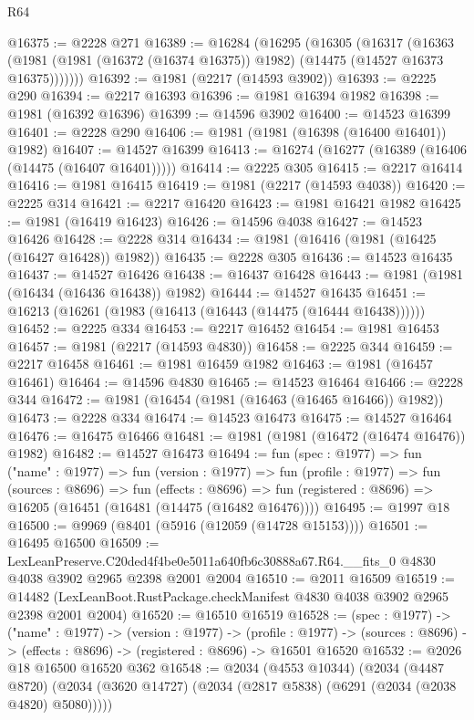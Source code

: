 \begin{lexlean}{R64}
\begin{coremodule}
@16375 := @2228 @271
@16389 := @16284
    (@16295
      (@16305
        (@16317
          (@16363 (@1981 (@1981 (@16372 (@16374 @16375)) @1982) (@14475 (@14527 @16373 @16375)))))))
@16392 := @1981 (@2217 (@14593 @3902))
@16393 := @2225 @290
@16394 := @2217 @16393
@16396 := @1981 @16394 @1982
@16398 := @1981 (@16392 @16396)
@16399 := @14596 @3902
@16400 := @14523 @16399
@16401 := @2228 @290
@16406 := @1981 (@1981 (@16398 (@16400 @16401)) @1982)
@16407 := @14527 @16399
@16413 := @16274 (@16277 (@16389 (@16406 (@14475 (@16407 @16401)))))
@16414 := @2225 @305
@16415 := @2217 @16414
@16416 := @1981 @16415
@16419 := @1981 (@2217 (@14593 @4038))
@16420 := @2225 @314
@16421 := @2217 @16420
@16423 := @1981 @16421 @1982
@16425 := @1981 (@16419 @16423)
@16426 := @14596 @4038
@16427 := @14523 @16426
@16428 := @2228 @314
@16434 := @1981 (@16416 (@1981 (@16425 (@16427 @16428)) @1982))
@16435 := @2228 @305
@16436 := @14523 @16435
@16437 := @14527 @16426
@16438 := @16437 @16428
@16443 := @1981 (@1981 (@16434 (@16436 @16438)) @1982)
@16444 := @14527 @16435
@16451 := @16213 (@16261 (@1983 (@16413 (@16443 (@14475 (@16444 @16438))))))
@16452 := @2225 @334
@16453 := @2217 @16452
@16454 := @1981 @16453
@16457 := @1981 (@2217 (@14593 @4830))
@16458 := @2225 @344
@16459 := @2217 @16458
@16461 := @1981 @16459 @1982
@16463 := @1981 (@16457 @16461)
@16464 := @14596 @4830
@16465 := @14523 @16464
@16466 := @2228 @344
@16472 := @1981 (@16454 (@1981 (@16463 (@16465 @16466)) @1982))
@16473 := @2228 @334
@16474 := @14523 @16473
@16475 := @14527 @16464
@16476 := @16475 @16466
@16481 := @1981 (@1981 (@16472 (@16474 @16476)) @1982)
@16482 := @14527 @16473
@16494 := fun (spec : @1977) =>
  fun ("name" : @1977) =>
  fun (version : @1977) =>
  fun (profile : @1977) =>
  fun (sources : @8696) =>
  fun (effects : @8696) =>
  fun (registered : @8696) => @16205 (@16451 (@16481 (@14475 (@16482 @16476))))
@16495 := @1997 @18
@16500 := @9969 (@8401 (@5916 (@12059 (@14728 @15153))))
@16501 := @16495 @16500
@16509 := LexLeanPreserve.C20ded4f4be0e5011a640fb6c30888a67.R64.__fits_0
    @4830
    @4038
    @3902
    @2965
    @2398
    @2001
    @2004
@16510 := @2011 @16509
@16519 := @14482 (LexLeanBoot.RustPackage.checkManifest @4830 @4038 @3902 @2965 @2398 @2001 @2004)
@16520 := @16510 @16519
@16528 := (spec : @1977) ->
  ("name" : @1977) ->
  (version : @1977) ->
  (profile : @1977) ->
  (sources : @8696) -> (effects : @8696) -> (registered : @8696) -> @16501 @16520
@16532 := @2026 @18 @16500 @16520 @362
@16548 := @2034
    (@4553 @10344)
    (@2034
      (@4487 @8720)
      (@2034 (@3620 @14727) (@2034 (@2817 @5838) (@6291 (@2034 (@2038 @4820) @5080)))))

\end{coremodule}
\end{lexlean}
